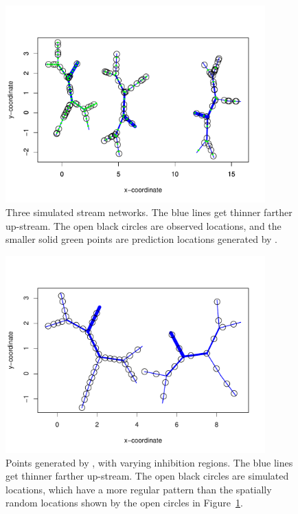 \documentclass[nojss]{jss}
\begin{document}
\begin{figure}[htb]
  \begin{center}
    \includegraphics[keepaspectratio=true, width = 100mm]{Figures/jss984Fig-SimSSN1}
    \caption{Three simulated stream networks. The blue lines get
      thinner farther up-stream. The open black circles are observed
      locations, and the smaller solid green points are prediction
      locations generated by . \label{SimSSN1}}
  \end{center}
\end{figure}

\begin{figure}[htbp]
  \begin{center}
    \includegraphics[keepaspectratio=true, width = 100mm]{Figures/jss984Fig-SimHardcore}
    \caption{Points generated by , with varying
      inhibition regions. The blue lines get thinner farther up-stream. The open black circles are simulated
      locations, which have a more regular pattern than the spatially random locations shown by the open circles in Figure~\ref{SimSSN1}. \label{SimHardcore}}
  \end{center}
\end{figure}
\end{document}
